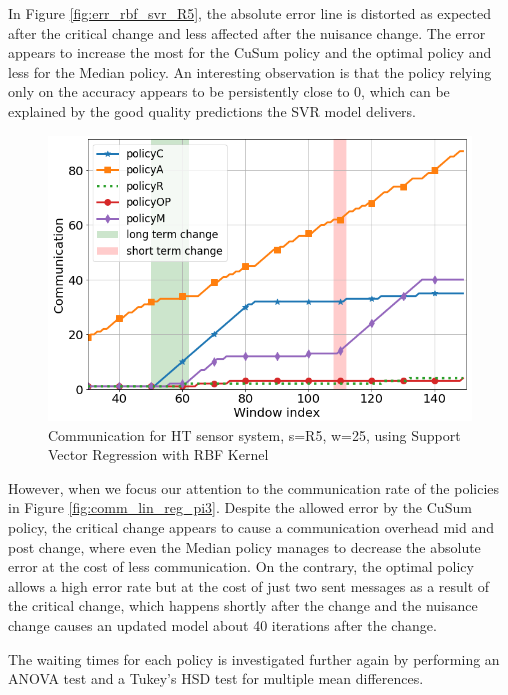 \documentclass{mpaper}
\begin{document}
In Figure \ref{fig:err_rbf_svr_R5}, the absolute error line is distorted as expected after the critical change and less affected after the nuisance change. The error appears to increase the most for the CuSum policy and the optimal policy and less for the Median policy. An interesting observation is that the policy relying only on the accuracy appears to be persistently close to 0, which can be explained by the good quality predictions the SVR model delivers.

\begin{figure}[h]
    \centering
    \includegraphics[scale=0.34]{imgs/comm_svr_rbf_R5.png}
    \caption{Communication for HT sensor system, s=R5, w=25, using Support Vector Regression with RBF Kernel}
    \label{fig:comm_rbf_svr_R5}
\end{figure}

However, when we focus our attention to the communication rate of the policies in Figure \ref{fig:comm_lin_reg_pi3}. Despite the allowed error by the CuSum policy, the critical change appears to cause a communication overhead mid and post change, where even the Median policy manages to decrease the absolute error at the cost of less communication. On the contrary, the optimal policy allows a high error rate but at the cost of just two sent messages as a result of the critical change, which happens shortly after the change and the nuisance change causes an updated model about 40 iterations after the change.

The waiting times for each policy is investigated further again by performing an ANOVA test and a Tukey's HSD test for multiple mean differences.
\end{document}
